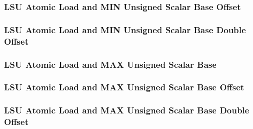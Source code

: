 

\subsubsection[{\small LSU Atomic Load and MIN Unsigned Scalar Base Offset}]{LSU Atomic Load and MIN Unsigned Scalar Base Offset} \label{sec:format-LSU-ALMINUSB.O}



\subsubsection[{\small LSU Atomic Load and MIN Unsigned Scalar Base Double Offset}]{LSU Atomic Load and MIN Unsigned Scalar Base Double Offset} \label{sec:format-LSU-ALMINUSB.D}



\subsubsection[{\small LSU Atomic Load and MAX Unsigned Scalar Base}]{LSU Atomic Load and MAX Unsigned Scalar Base} \label{sec:format-LSU-ALMAXUSB}



\subsubsection[{\small LSU Atomic Load and MAX Unsigned Scalar Base Offset}]{LSU Atomic Load and MAX Unsigned Scalar Base Offset} \label{sec:format-LSU-ALMAXUSB.O}



\subsubsection[{\small LSU Atomic Load and MAX Unsigned Scalar Base Double Offset}]{LSU Atomic Load and MAX Unsigned Scalar Base Double Offset} \label{sec:format-LSU-ALMAXUSB.D}

